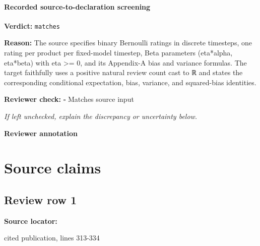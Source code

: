 \documentclass[10pt]{article}
\newcommand{\reviewerbox}{%
  \par\noindent\fbox{\parbox{0.96\linewidth}{\rule{0pt}{0.38in}}}\par
}
\newcommand{\reviewmatch}[1]{%
  \par\noindent\textbf{Reviewer check:} $\square$\; #1\par
  \noindent\emph{If left unchecked, explain the discrepancy or uncertainty below.}\par
}
\begin{document}
\paragraph{Recorded source-to-declaration screening}
\textbf{Verdict:} \texttt{matches}
\\
{\raggedright
\textbf{Reason:} The source specifies binary Bernoulli ratings in discrete timesteps, one rating per product per fixed-\allowbreak{}model timestep, Beta parameters (eta*alpha, eta*beta) with eta >= 0, and its Appendix-\allowbreak{}A bias and variance formulas.\allowbreak{} The target faithfully uses a positive natural review count cast to ℝ and states the corresponding conditional expectation, bias, variance, and squared-\allowbreak{}bias identities.\allowbreak{}
\par}
\reviewmatch{Matches source input}
\noindent\textbf{Reviewer annotation}\par
\reviewerbox

\clearpage
\hypertarget{source-claim-98cc132a8c76d666}{}
\hypertarget{source-section-f10b5f68e4acf3dc}{}
\section*{Source claims}
\subsection*{Review row 1}
\textbf{Source locator:} {\footnotesize\raggedright cited publication, lines 313-\allowbreak{}334\par}
\end{document}

